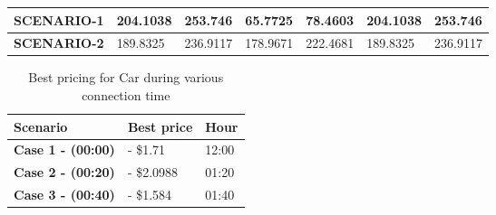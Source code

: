 \begin{table}[h]
\begin{tabular}{|cl|ll|ll|ll|}
			\multicolumn{2}{|c|}{\textbf{SCENARIO-1}}                & \multicolumn{1}{l|}{204.1038}                                                                                  & 253.746                                                                                                         & \multicolumn{1}{l|}{65.7725}                                                                                   & 78.4603                                                                                                         & \multicolumn{1}{l|}{204.1038}                                                                                  & 253.746                                                                                                         \\ \hline
			\multicolumn{2}{|c|}{\textbf{SCENARIO-2}}                & \multicolumn{1}{l|}{189.8325}                                                                                  & 236.9117                                                                                                        & \multicolumn{1}{l|}{178.9671}                                                                                  & 222.4681                                                                                                        & \multicolumn{1}{l|}{189.8325}                                                                                  & 236.9117                                                                                                        \\ \hline
		\end{tabular}
			
	\end{table}


		\begin{table}[h]
			\centering
			\begin{tabular}{|l|l|l|}
				\hline
				\textbf{Scenario}         & \textbf{Best price} & \textbf{Hour} \\ \hline
				\textbf{Case 1 - (00:00)} & - \$1.71            & 12:00         \\ \hline
				\textbf{Case 2 - (00:20)} & - \$2.0988          & 01:20         \\ \hline
				\textbf{Case 3 - (00:40)} & - \$1.584           & 01:40         \\ \hline
			\end{tabular}
			\caption{Best pricing for Car during various connection time}
		\end{table}

